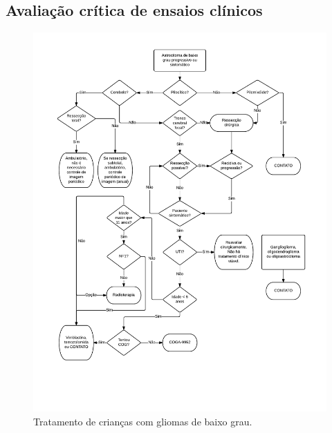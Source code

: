 \documentclass[11pt,a4paper,oldfontcommands]{memoir}
\begin{document}
\subsection{Avaliação crítica de ensaios clínicos}
\begin{figure}[!htb]
\includegraphics[scale=0.87,trim = 18mm 30mm 15mm 12mm,clip]{fig/fig3.pdf}
\caption{Tratamento de crianças com gliomas de baixo grau.}
\end{figure}
\end{document}
